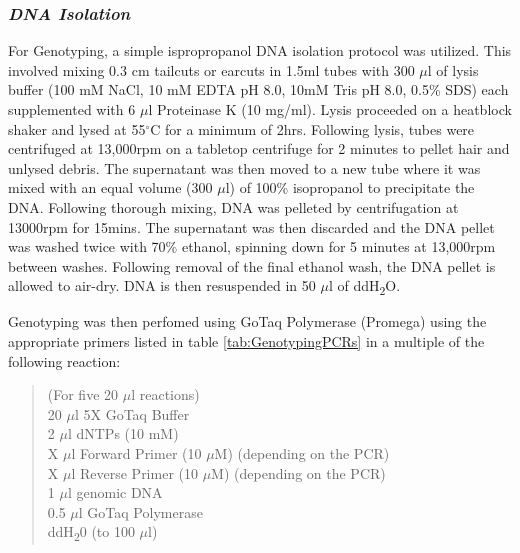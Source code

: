 \documentclass[onehalf,12pt]{beavtex}
\begin{document}
  \subsubsection*{\texorpdfstring{\emph{DNA
  Isolation}}{DNA Isolation}}\label{dna-isolation}
  
  For Genotyping, a simple ispropropanol DNA isolation protocol was
  utilized. This involved mixing 0.3 cm tailcuts or earcuts in 1.5ml tubes
  with 300 \(\mu\)l of lysis buffer (100 mM NaCl, 10 mM EDTA pH 8.0, 10mM
  Tris pH 8.0, 0.5\% SDS) each supplemented with 6 \(\mu\)l Proteinase K
  (10 mg/ml). Lysis proceeded on a heatblock shaker and lysed at
  55\(^\circ\)C for a minimum of 2hrs. Following lysis, tubes were
  centrifuged at 13,000rpm on a tabletop centrifuge for 2 minutes to
  pellet hair and unlysed debris. The supernatant was then moved to a new
  tube where it was mixed with an equal volume (300 \(\mu\)l) of 100\%
  isopropanol to precipitate the DNA. Following thorough mixing, DNA was
  pelleted by centrifugation at 13000rpm for 15mins. The supernatant was
  then discarded and the DNA pellet was washed twice with 70\% ethanol,
  spinning down for 5 minutes at 13,000rpm between washes. Following
  removal of the final ethanol wash, the DNA pellet is allowed to air-dry.
  DNA is then resuspended in 50 \(\mu\)l of ddH\textsubscript{2}O.
  
  Genotyping was then perfomed using GoTaq Polymerase (Promega) using the
  appropriate primers listed in table \ref{tab:GenotypingPCRs} in a
  multiple of the following reaction:
  
  \begin{quote}
  (For five 20 \(\mu\)l reactions)\\
  20 \(\mu\)l 5X GoTaq Buffer\\
  2 \(\mu\)l dNTPs (10 mM)\\
  X \(\mu\)l Forward Primer (10 \(\mu\)M) (depending on the PCR)\\
  X \(\mu\)l Reverse Primer (10 \(\mu\)M) (depending on the PCR)\\
  1 \(\mu\)l genomic DNA\\
  0.5 \(\mu\)l GoTaq Polymerase\\
  ddH\textsubscript{2}0 (to 100 \(\mu\)l)
  \end{quote}
  
\end{document}
